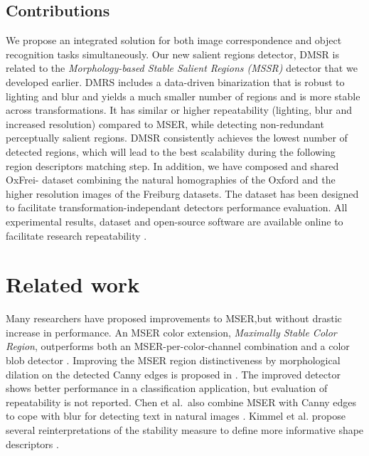 \documentclass[conference,compsoc]{IEEEtran}
\begin{document}
\subsection{Contributions}
 We propose an integrated solution for both image correspondence and object recognition tasks simultaneously. Our new salient regions detector, DMSR is related to the {\em Morphology-based Stable Salient Regions (MSSR)} detector that we developed earlier\cite{RangMSSR06, RangHumpb06}. DMRS includes a data-driven binarization that is robust to lighting and blur and yields a much smaller number of regions and is more stable across transformations. It has similar or higher  repeatability (lighting, blur and increased resolution) compared to MSER, while detecting non-redundant perceptually salient regions. DMSR consistently achieves the lowest number of detected regions, which will lead to the best scalability during the following region descriptors matching step.  In addition, we have composed and shared OxFrei- dataset combining the natural homographies of the Oxford and the higher resolution images of the Freiburg datasets. The dataset has been designed to facilitate transformation-independant detectors performance evaluation. All experimental results, dataset and open-source software are available online to facilitate research repeatability \cite{elena_ranguelova_2016_45156}. 


\section{Related work}
Many researchers have proposed improvements to MSER,but without drastic increase in performance. An MSER color extension, {\em Maximally Stable Color Region}, outperforms both an MSER-per-color-channel combination and a color blob detector \cite{Forssen07}. Improving the MSER region distinctiveness by morphological dilation on the detected Canny edges is proposed in \cite{Wang14}. The improved detector shows better performance in a classification application, but evaluation of repeatability is not reported. 
Chen et al.~also combine MSER with Canny edges to cope with blur for detecting text in natural images \cite{Chen11}.
Kimmel et al. %
propose several reinterpretations of the stability measure to define more informative shape descriptors \cite{Kimmel11}. 
\end{document}
